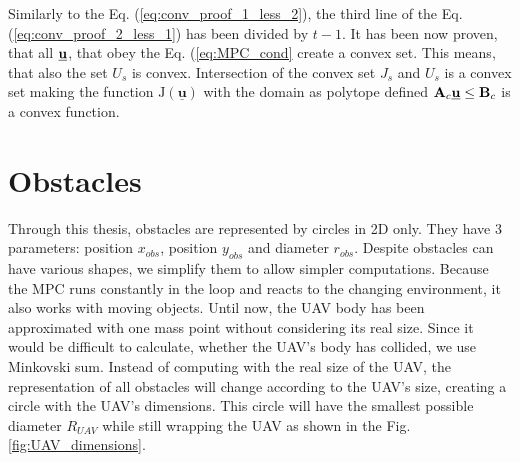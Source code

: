 \documentclass[a4paper,11pt,titlepage]{article}
\newcommand{\uvec}{\textbf{\underline{u}}}
\begin{document}
Similarly to the Eq. (\ref{eq:conv_proof_1_less_2}), the third line of the Eq. (\ref{eq:conv_proof_2_less_1}) has been divided by $t-1$. 
It has been now proven, that all $\uvec$, that obey the Eq. (\ref{eq:MPC_cond} create a convex set. This means, that also the set $U_s$ is convex. Intersection of the convex set $J_s$ and $U_s$ is a convex set making the function $\mathrm{J}(\underline{\textbf{u}})$ with the domain as polytope defined $\textbf{A}_c \uvec \leq \textbf{B}_c$ is a convex function.

\section{Obstacles}
Through this thesis, obstacles are represented by circles in 2D only. They have 3 parameters: position $x_{obs}$, position $y_{obs}$ and diameter $r_{obs}$. Despite obstacles can have various shapes, we simplify them to allow simpler computations. Because the MPC runs constantly in the loop and reacts to the changing environment, it also works with moving objects. Until now, the UAV body has been approximated with one mass point without considering its real size. Since it would be difficult to calculate, whether the UAV's body has collided, we use Minkovski sum. Instead of computing with the real size of the UAV, the representation of all obstacles will change according to the UAV's size, creating a circle with the UAV's dimensions. This circle will have the smallest possible diameter $R_{UAV}$ while still wrapping the UAV as shown in the Fig. \ref{fig:UAV_dimensions}. 
\end{document}
